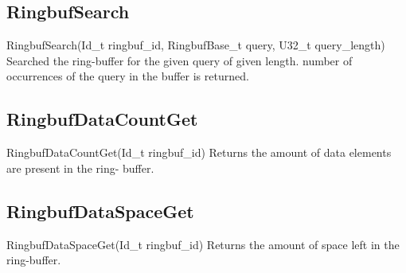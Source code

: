 \subsection{RingbufSearch}
\label{func:RingbufSearch}
\begin{pdfunction}
{RingbufSearch(Id\_t ringbuf\_id, RingbufBase\_t query,  U32\_t query\_length) }
{ 
Searched the ring-buffer for the given query of given length. 
number of occurrences of the query in the buffer is returned. }
\end{pdfunction}

\subsection{RingbufDataCountGet}
\label{func:RingbufDataCountGet}
\begin{pdfunction}
{RingbufDataCountGet(Id\_t ringbuf\_id) }
{ 
Returns the amount of data elements are present in the ring- 
buffer.}
\end{pdfunction}

\subsection{RingbufDataSpaceGet}
\label{func:RingbufDataSpaceGet}
\begin{pdfunction}
{RingbufDataSpaceGet(Id\_t ringbuf\_id) }
{ 
Returns the amount of space left in the ring-buffer. }
\end{pdfunction}
